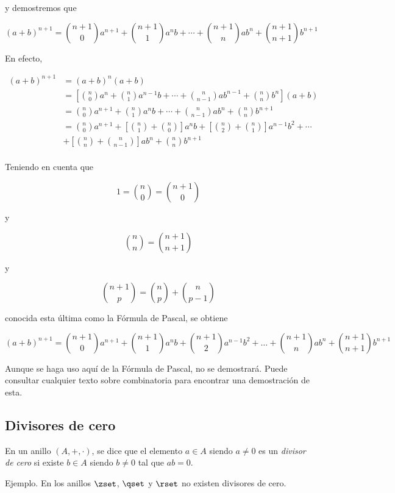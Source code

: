 \noindent y demostremos que

$$ (a + b)^{n+1} = \binom{n+1}{0} a^{n+1} + \binom{n+1}{1} a^n b + \cdots +
\binom{n+1}{n} ab^n + \binom{n+1}{n+1} b^{n+1} $$

\indent En efecto,

\begin{align*}
  (a + b)^{n+1}
    &= (a + b)^n (a + b) \\
    &= \left[ \binom{n}{0} a^n + \binom{n}{1} a^{n-1}b + \cdots +
      \binom{n}{n-1} ab^{n-1} + \binom{n}{n} b^n \right](a + b) \\
    &= \binom{n}{0} a^{n+1} + \binom{n}{1} a^n b + \cdots +
      \binom{n}{n-1} ab^n + \binom{n}{n} b^{n+1} \\
    &= \binom{n}{0} a^{n+1} + \left[\binom{n}{1} + \binom{n}{0}\right]
      a^n b + \left[\binom{n}{2} + \binom{n}{1}\right] a^{n-1}b^2 +
      \cdots \\
    &+ \left[\binom{n}{n} + \binom{n}{n-1}\right] ab^n + \binom{n}{n}
    b^{n+1} \\
\end{align*}

Teniendo en cuenta que

$$ 1 = \binom{n}{0} = \binom{n+1}{0} $$

\noindent y

$$ \binom{n}{n} = \binom{n+1}{n+1} $$

\noindent y

$$ \binom{n+1}{p} = \binom{n}{p} + \binom{n}{p-1} $$

\noindent conocida esta última como la Fórmula de Pascal, se obtiene

$$ (a + b)^{n+1} = \binom{n+1}{0} a^{n+1} + \binom{n+1}{1} a^n b +
\binom{n+1}{2} a^{n-1}b^2 + \dots + \binom{n+1}{n} ab^n + \binom{n+1}{n+1}
b^{n+1} $$

Aunque se haga uso aquí de la Fórmula de Pascal, no se demostrará. Puede
consultar cualquier texto sobre combinatoria para encontrar una demostración
de esta.




\subsection{Divisores de cero}

En un anillo $(A, +, \cdot)$, se dice que el elemento $a \in A$ siendo $a
\neq 0$ es un \emph{divisor de cero} si existe $b \in A$ siendo $b \neq 0$
tal que $ab = 0$.

Ejemplo. En los anillos $\zset$, $\qset$ y $\rset$ no existen divisores de
cero.

